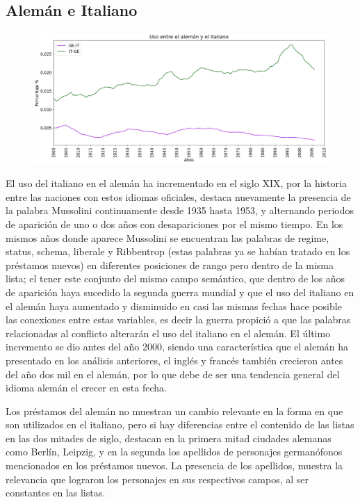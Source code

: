 \newpage
\subsection{Alemán e Italiano}

\begin{figure}[h!]
	\centering
	\includegraphics[scale=.38]{Cap_4/SF_3_S2_GE.png}
	\label{SF_GI}
	\caption{}
\end{figure}

El uso del italiano en el alemán ha incrementado en el siglo XIX, por la historia entre las naciones con estos idiomas oficiales,  destaca nuevamente la presencia de la palabra Mussolini  continuamente desde 1935 hasta 1953, y alternando periodos de aparición de uno o dos años  con desapariciones por el mismo tiempo. En los mismos años donde aparece Mussolini se encuentran las palabras de regime, status, schema, liberale y Ribbentrop  (estas palabras ya se habían tratado en los préstamos nuevos) en diferentes posiciones de rango pero dentro de la misma lista; el tener este conjunto del mismo campo semántico, que dentro de los años de aparición haya sucedido la segunda guerra mundial y que el uso del italiano en el alemán haya aumentado y disminuido en casi las mismas fechas hace posible las conexiones entre estas variables, es decir la guerra propició a que las palabras relacionadas al conflicto alterarán el uso del italiano en el alemán.    El último incremento se dio antes del año 2000,  siendo una característica que el alemán ha presentado en los análisis anteriores, el inglés  y francés también crecieron antes del año dos mil en el alemán, por lo que debe de ser una tendencia general del idioma alemán el crecer en esta fecha. 

Los préstamos del alemán no muestran un cambio relevante en la forma en que son utilizados en el italiano,  pero si hay diferencias entre el contenido de las listas en las dos mitades de siglo,  destacan en la primera mitad ciudades alemanas como Berlín, Leipzig, y en la segunda los apellidos de personajes germanófonos mencionados en los préstamos nuevos.  La presencia de los apellidos, muestra la relevancia que lograron los personajes en sus respectivos campos,  al ser constantes en las listas. 


